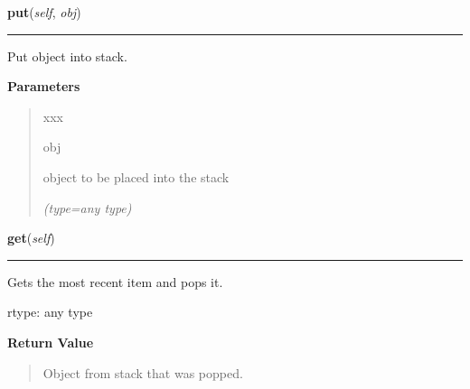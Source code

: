 \hspace{.8\funcindent}\begin{boxedminipage}{\funcwidth}

    \raggedright \textbf{put}(\textit{self}, \textit{obj})

    \vspace{-1.5ex}

    \rule{\textwidth}{0.5\fboxrule}
\setlength{\parskip}{2ex}
    Put object into stack.

\setlength{\parskip}{1ex}
      \textbf{Parameters}
      \vspace{-1ex}

      \begin{quote}
        \begin{Ventry}{xxx}

          \item[obj]

          object to be placed into the stack

            {\it (type=any type)}

        \end{Ventry}

      \end{quote}

    \end{boxedminipage}

    \label{UnBlockMeSolver:Utility:Stack:Stack:get}

    \vspace{0.5ex}

\hspace{.8\funcindent}\begin{boxedminipage}{\funcwidth}

    \raggedright \textbf{get}(\textit{self})

    \vspace{-1.5ex}

    \rule{\textwidth}{0.5\fboxrule}
\setlength{\parskip}{2ex}
    Gets the most recent item and pops it.

    rtype:   any type

\setlength{\parskip}{1ex}
      \textbf{Return Value}
    \vspace{-1ex}

      \begin{quote}
      Object from stack that was popped.

      \end{quote}

    \end{boxedminipage}

